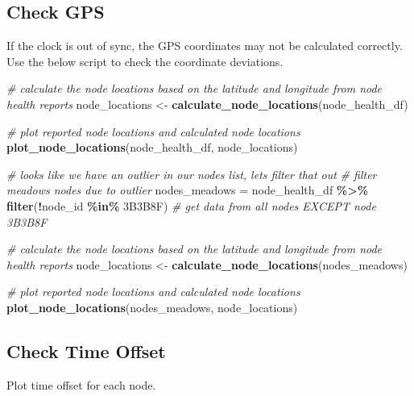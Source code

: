 \documentclass[
]{book}
\newenvironment{Shaded}{\begin{snugshade}}{\end{snugshade}}
\newcommand{\CommentTok}[1]{\textcolor[rgb]{0.56,0.35,0.01}{\textit{#1}}}
\newcommand{\FunctionTok}[1]{\textcolor[rgb]{0.13,0.29,0.53}{\textbf{#1}}}
\newcommand{\NormalTok}[1]{#1}
\newcommand{\OtherTok}[1]{\textcolor[rgb]{0.56,0.35,0.01}{#1}}
\newcommand{\SpecialCharTok}[1]{\textcolor[rgb]{0.81,0.36,0.00}{\textbf{#1}}}
\newcommand{\StringTok}[1]{\textcolor[rgb]{0.31,0.60,0.02}{#1}}
\begin{document}
\subsection{Check GPS}\label{check-gps}

If the clock is out of sync, the GPS coordinates may not be calculated correctly. Use the below script to check the coordinate deviations.

\begin{Shaded}
\begin{Highlighting}[]
\CommentTok{\# calculate the node locations based on the latitude and longitude from node health reports}
\NormalTok{node\_locations }\OtherTok{\textless{}{-}} \FunctionTok{calculate\_node\_locations}\NormalTok{(node\_health\_df)}

\CommentTok{\# plot reported node locations and calculated node locations}
\FunctionTok{plot\_node\_locations}\NormalTok{(node\_health\_df, node\_locations)}

\CommentTok{\# looks like we have an outlier in our nodes list, let\textquotesingle{}s filter that out}
\CommentTok{\# filter meadows nodes due to outlier}
\NormalTok{nodes\_meadows }\OtherTok{=}\NormalTok{ node\_health\_df }\SpecialCharTok{\%\textgreater{}\%}
  \FunctionTok{filter}\NormalTok{(}\SpecialCharTok{!}\NormalTok{node\_id }\SpecialCharTok{\%in\%} \StringTok{\textquotesingle{}3B3B8F\textquotesingle{}}\NormalTok{) }\CommentTok{\# get data from all nodes EXCEPT node 3B3B8F}

\CommentTok{\# calculate the node locations based on the latitude and longitude from node health reports}
\NormalTok{node\_locations }\OtherTok{\textless{}{-}} \FunctionTok{calculate\_node\_locations}\NormalTok{(nodes\_meadows)}

\CommentTok{\# plot reported node locations and calculated node locations}
\FunctionTok{plot\_node\_locations}\NormalTok{(nodes\_meadows, node\_locations)}
\end{Highlighting}
\end{Shaded}

\subsection{Check Time Offset}\label{check-time-offset}

Plot time offset for each node.
\end{document}

